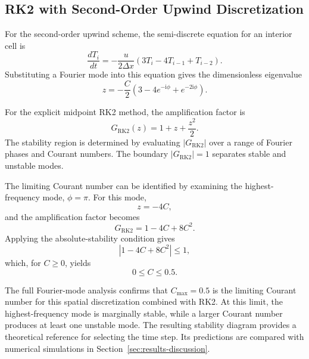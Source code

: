 \subsection{RK2 with Second-Order Upwind Discretization}
\label{subsec:rk2-upwind-stability}

For the second-order upwind scheme, the semi-discrete equation for an interior cell is
\begin{equation}
    \frac{dT_i}{dt}
    = -\frac{u}{2\Delta x}
    \left(3T_i-4T_{i-1}+T_{i-2}\right).
    \label{eq:upwind2-semidiscrete}
\end{equation}
Substituting a Fourier mode into this equation gives the dimensionless eigenvalue
\begin{equation}
    \boxed{z=-\frac{C}{2}
    \left(3-4e^{-\mathrm{i}\phi}+e^{-2\mathrm{i}\phi}\right)}.
    \label{eq:upwind2-rk2-z}
\end{equation}

For the explicit midpoint RK2 method, the amplification factor is
\begin{equation}
    G_{\mathrm{RK2}}(z)=1+z+\frac{z^2}{2}.
    \label{eq:rk2-amplification}
\end{equation}
The stability region is determined by evaluating $|G_{\mathrm{RK2}}|$ over a range of Fourier phases and Courant numbers. The boundary $|G_{\mathrm{RK2}}|=1$ separates stable and unstable modes.

The limiting Courant number can be identified by examining the highest-frequency mode, $\phi=\pi$. For this mode,
\begin{equation}
    z=-4C,
    \label{eq:upwind2-high-frequency-z}
\end{equation}
and the amplification factor becomes
\begin{equation}
    G_{\mathrm{RK2}}=1-4C+8C^2.
    \label{eq:rk2-high-frequency-amplification}
\end{equation}
Applying the absolute-stability condition gives
\begin{equation}
    |1-4C+8C^2|\leq 1,
\end{equation}
which, for $C\geq 0$, yields
\begin{equation}
    \boxed{0\leq C\leq 0.5}.
    \label{eq:rk2-upwind-cfl-limit}
\end{equation}

The full Fourier-mode analysis confirms that $C_{\max}=0.5$ is the limiting Courant number for this spatial discretization combined with RK2. At this limit, the highest-frequency mode is marginally stable, while a larger Courant number produces at least one unstable mode. The resulting stability diagram provides a theoretical reference for selecting the time step. Its predictions are compared with numerical simulations in Section~\ref{sec:results-discussion}.

